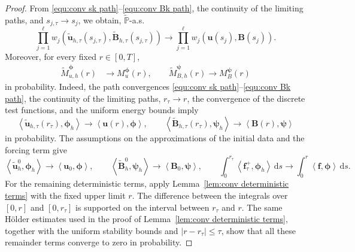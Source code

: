 \documentclass[11pt, reqno]{amsart}
\theoremstyle{definition}
\numberwithin{equation}{section}
\newcommand{\bff}{\boldsymbol}
\newcommand{\bb}{\mathbb}
\newcommand{\ds}{\,\mathrm{d}s}
\newcommand{\inpro}[2]{\left\langle#1,#2\right\rangle}
\newcommand{\abs}[1]{\left|{#1}\right|}
\begin{document}
\begin{proof}
	From \eqref{equ:conv sk path}--\eqref{equ:conv Bk path}, the continuity of the limiting paths, and
	$s_{j,\tau}\to s_j$, we obtain, $\widetilde{\bb P}$-a.s.
	\[
	\prod_{j=1}^{\ell}
	w_j\left(
	\widetilde{\bff u}_{h,\tau}(s_{j,\tau}),
	\widetilde{\bff B}_{h,\tau}(s_{j,\tau})
	\right)
	\longrightarrow
	\prod_{j=1}^{\ell}
	w_j\left(
	\bff u(s_j),\bff B(s_j)
	\right).
	\]
	Moreover, for every fixed $r\in[0,T]$,
	\begin{align}
		\label{equ:conv residuals}
		\widetilde M_{u,h}^{\bff\phi}(r)
		&\longrightarrow
		M_u^{\bff\phi}(r),
		\qquad
		\widetilde M_{B,h}^{\bff\psi}(r)
		\longrightarrow
		M_B^{\bff\psi}(r)
	\end{align}
	in probability. Indeed, the path convergences
	\eqref{equ:conv sk path}--\eqref{equ:conv Bk path}, the continuity of the
	limiting paths, $r_\tau\to r$, the convergence of the discrete test
	functions, and the uniform energy bounds imply
	\[
	\inpro{
		\widetilde{\bff u}_{h,\tau}(r_\tau)}
	{\bff\phi_h}
	\longrightarrow
	\inpro{\bff u(r)}{\bff\phi},
	\qquad
	\inpro{
		\widetilde{\bff B}_{h,\tau}(r_\tau)}
	{\bff\psi_h}
	\longrightarrow
	\inpro{\bff B(r)}{\bff\psi}
	\]
	in probability. The assumptions on the approximations of the initial data and the forcing term give
	\[
	\inpro{\widetilde{\bff u}_h^0}{\bff\phi_h}
	\longrightarrow
	\inpro{\bff u_0}{\bff\phi},
	\qquad
	\inpro{\widetilde{\bff B}_h^0}{\bff\psi_h}
	\longrightarrow
	\inpro{\bff B_0}{\bff\psi},
	\qquad
	\int_0^{r_\tau}
	\inpro{\bff f_\tau^+}{\bff\phi_h}\ds
	\longrightarrow
	\int_0^r
	\inpro{\bff f}{\bff\phi}\ds.
	\]
	For the remaining deterministic terms, apply
	Lemma~\ref{lem:conv deterministic terms} with the fixed upper limit $r$.
	The difference between the integrals over $[0,r]$ and $[0,r_\tau]$ is
	supported on the interval between $r_\tau$ and $r$. The same H\"older
	estimates used in the proof of
	Lemma~\ref{lem:conv deterministic terms}, together with the uniform
	stability bounds and $\abs{r-r_\tau}\le\tau$, show that all these
	remainder terms converge to zero in probability.
	

\end{proof}
\end{document}
